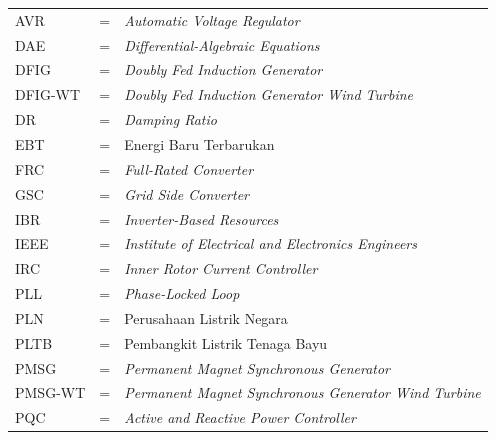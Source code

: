 \begin{tabular}{llp{3in}}

	AVR      & \hspace{1.5cm} = & \textit{Automatic Voltage Regulator} \\
	DAE      & \hspace{1.5cm} = & \textit{Differential-Algebraic Equations} \\
	DFIG     & \hspace{1.5cm} = & \textit{Doubly Fed Induction Generator} \\
	DFIG-WT  & \hspace{1.5cm} = & \textit{Doubly Fed Induction Generator Wind Turbine} \\
	DR       & \hspace{1.5cm} = & \textit{Damping Ratio} \\
	EBT      & \hspace{1.5cm} = & Energi Baru Terbarukan \\
	FRC      & \hspace{1.5cm} = & \textit{Full-Rated Converter} \\
	GSC      & \hspace{1.5cm} = & \textit{Grid Side Converter} \\
	IBR      & \hspace{1.5cm} = & \textit{Inverter-Based Resources} \\
	IEEE     & \hspace{1.5cm} = & \textit{Institute of Electrical and Electronics Engineers} \\
	IRC      & \hspace{1.5cm} = & \textit{Inner Rotor Current Controller} \\
	PLL      & \hspace{1.5cm} = & \textit{Phase-Locked Loop} \\
	PLN      & \hspace{1.5cm} = & Perusahaan Listrik Negara \\
	PLTB     & \hspace{1.5cm} = & Pembangkit Listrik Tenaga Bayu \\
	PMSG     & \hspace{1.5cm} = & \textit{Permanent Magnet Synchronous Generator} \\
	PMSG-WT  & \hspace{1.5cm} = & \textit{Permanent Magnet Synchronous Generator Wind Turbine} \\
	PQC      & \hspace{1.5cm} = & \textit{Active and Reactive Power Controller} \\

\end{tabular}
